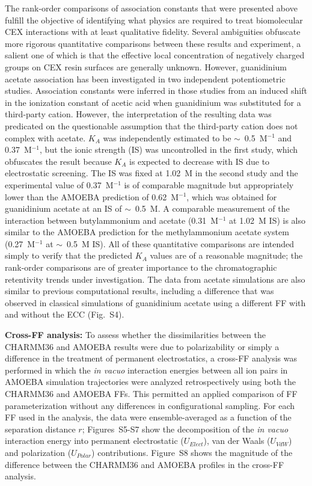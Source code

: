 \documentclass[journal=jpclcd,manuscript=article,articletitle=true,layout=twocolumn]{achemso}
\begin{document}
The rank-order comparisons of association constants that were presented above fulfill the objective of identifying what physics are required to treat biomolecular CEX interactions with at least qualitative fidelity. Several ambiguities obfuscate more rigorous quantitative comparisons between these results and experiment, a salient one of which is that the effective local concentration of negatively charged groups on CEX resin surfaces are generally unknown. However, guanidinium acetate association has been investigated in two independent potentiometric studies.\cite{Tanford1954, Haake1977} Association constants were inferred in those studies from an induced shift in the ionization constant of acetic acid when guanidinium was substituted for a third-party cation. However, the interpretation of the resulting data was predicated on the questionable assumption that the third-party cation does not complex with acetate. $K_A$ was independently estimated to be $\sim$~0.5~M$^{-1}$ and 0.37~M$^{-1}$,\cite{Tanford1954, Haake1977} but the ionic strength (IS) was uncontrolled in the first study,\cite{Tanford1954} which obfuscates the result because $K_A$ is expected to decrease with IS due to electrostatic screening. The IS was fixed at 1.02~M in the second study\cite{Haake1977} and the experimental value of 0.37~M$^{-1}$ is of comparable magnitude but appropriately lower than the AMOEBA prediction of 0.62~M$^{-1}$, which was obtained for guanidinium acetate at an IS of $\sim$~0.5~M. A comparable measurement of the interaction between butylammonium and acetate (0.31~M$^{-1}$ at 1.02~M IS)\cite{Haake1977} is also similar to the AMOEBA prediction for the methylammonium acetate system (0.27~M$^{-1}$ at $\sim$~0.5~M IS). All of these quantitative comparisons are intended simply to verify that the predicted $K_A$ values are of a reasonable magnitude; the rank-order comparisons are of greater importance to the chromatographic retentivity trends under investigation. The data from acetate simulations are also similar to previous computational results,\cite{Mason2019a, Debiec2014, Debiec2016} including a difference that was observed in classical simulations of guanidinium acetate using a different FF with and without the ECC (Fig.~S4).\cite{Mason2019a}

\textbf{Cross-FF analysis:} To assess whether the dissimilarities between the CHARMM36 and AMOEBA results were due to polarizability or simply a difference in the treatment of permanent electrostatics, a cross-FF analysis was performed in which the \emph{in vacuo} interaction energies between all ion pairs in AMOEBA simulation trajectories were analyzed retrospectively using both the CHARMM36 and AMOEBA FFs. This permitted an applied comparison of FF parameterization without any differences in configurational sampling. For each FF used in the analysis, the data were ensemble-averaged as a function of the separation distance $r$; Figures~S5-S7 show the decomposition of the \emph{in vacuo} interaction energy into permanent electrostatic ($U_{Elect}$), van der Waals ($U_{VdW}$) and polarization ($U_{Polar}$) contributions. Figure~S8 shows the magnitude of the difference between the CHARMM36 and AMOEBA profiles in the cross-FF analysis. 
\end{document}
